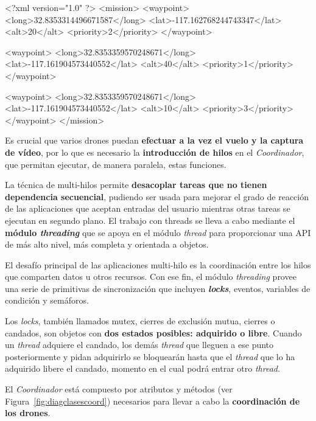 \begin{listing}[
 float=h!,
 language = XML,
 caption = {Ejemplo de archivo XML que contiene la información de los «waypoints»},
 label  = code:archivoxml]
<?xml version="1.0" ?>
<mission>
	<waypoint>
 		<long>32.8353314496671587</long>
 		<lat>-117.162768244743347</lat>
		<alt>20</alt>
		<priority>2</priority>
	</waypoint>

	<waypoint>
 		<long>32.8353359570248671</long>
 		<lat>-117.161904573440552</lat>
		<alt>40</alt>
		<priority>1</priority>
	</waypoint>

	<waypoint>
 		<long>32.8353359570248671</long>
 		<lat>-117.161904573440552</lat>
		<alt>10</alt>
		<priority>3</priority>
	</waypoint>
</mission>
\end{listing}


Es crucial que varios drones puedan \textbf{efectuar a la vez el vuelo y la captura de vídeo}, por lo que es necesario la \textbf{introducción de hilos} en el \textit{Coordinador}, que permitan ejecutar, de manera paralela, estas funciones. 

La técnica de multi-hilos permite \textbf{desacoplar tareas que no tienen dependencia secuencial}, pudiendo ser usada para mejorar el grado de reacción de las aplicaciones que aceptan entradas del usuario mientras otras tareas se ejecutan en segundo plano. El trabajo con threads se lleva a cabo mediante el \textbf{módulo \textit{threading}} que se apoya en el módulo \textit{thread} para proporcionar una \acs{API} de más alto nivel, más completa y orientada a objetos. 

El desafío principal de las aplicaciones multi-hilo es la coordinación entre los hilos que comparten datos u otros recursos. Con ese fin, el módulo \textit{threading} provee una serie de primitivas de sincronización que incluyen \textbf{\textit{locks}}, eventos, variables de condición y semáforos. 

Los \textit{locks}, también llamados mutex, cierres de exclusión mutua, cierres o candados, son objetos con \textbf{dos estados posibles: adquirido o libre}. Cuando un \textit{thread} adquiere el candado, los demás \textit{thread} que lleguen a ese punto posteriormente y pidan adquirirlo se bloquearán hasta que el \textit{thread} que lo ha adquirido libere el candado, momento en el cual podrá entrar otro \textit{thread}.

El \textit{Coordinador} está compuesto por atributos y métodos (ver Figura~\ref{fig:diagclasescoord}) necesarios para llevar a cabo la \textbf{coordinación de los drones}.

